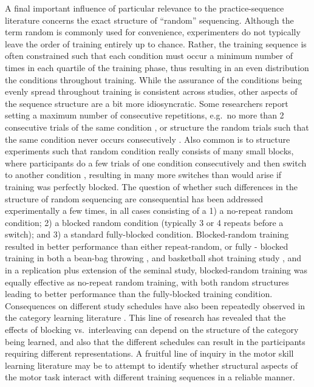 \documentclass[
  12pt,
  letterpaper,
]{article}
\begin{document}
A final important influence of particular relevance to the
practice-sequence literature concerns the exact structure of ``random''
sequencing. Although the term random is commonly used for convenience,
experimenters do not typically leave the order of training entirely up
to chance. Rather, the training sequence is often constrained such that
each condition must occur a minimum number of times in each quartile of
the training phase, thus resulting in an even distribution the
conditions throughout training. While the assurance of the conditions
being evenly spread throughout training is consistent across studies,
other aspects of the sequence structure are a bit more idiosyncratic.
Some researchers report setting a maximum number of consecutive
repetitions, e.g.~no more than 2 consecutive trials of the same
condition
\autocite{delreyEffectsContextualInterference1982,sheaContextualInterferenceEffects1979},
or structure the random trials such that the same condition never occurs
consecutively \autocite{wulfEffectTypePractice1991}. Also common is to
structure experiments such that random condition really consists of many
small blocks, where participants do a few trials of one condition
consecutively and then switch to another condition
\autocite{willeyLongtermMotorLearning2018,chuaPracticeVariabilityPromotes2019,wrisbergVariabilityPracticeHypothesis1987},
resulting in many more switches than would arise if training was
perfectly blocked. The question of whether such differences in the
structure of random sequencing are consequential has been addressed
experimentally a few times, in all cases consisting of a 1) a no-repeat
random condition; 2) a blocked random condition (typically 3 or 4
repeats before a switch); and 3) a standard fully-blocked condition.
Blocked-random training resulted in better performance than either
repeat-random, or fully - blocked training in both a bean-bag throwing
\autocite{pigottMotorSchemaStructure1984}, and basketball shot training
study \autocite{landinComparisonThreePractice1997}, and in a replication
plus extension of the seminal
\autocite{sheaContextualInterferenceEffects1979} study, blocked-random
training was equally effective as no-repeat random training, with both
random structures leading to better performance than the fully-blocked
training condition. Consequences on different study schedules have also
been repeatedly observed in the category learning literature
\autocite{carvalhoSequenceStudyChanges2017,carvalhoPuttingCategoryLearning2014}.
This line of research has revealed that the effects of blocking
vs.~interleaving can depend on the structure of the category being
learned, and also that the different schedules can result in the
participants requiring different representations. A fruitful line of
inquiry in the motor skill learning literature may be to attempt to
identify whether structural aspects of the motor task interact with
different training sequences in a reliable manner.
\end{document}

